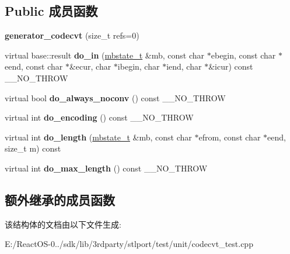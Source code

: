 \subsection*{Public 成员函数}
\begin{DoxyCompactItemize}
\item 
\mbox{\label{structgenerator__codecvt_ab4e85042054347530e588ae056644cb0}} 
{\bfseries generator\+\_\+codecvt} (size\+\_\+t refs=0)
\item 
\mbox{\label{structgenerator__codecvt_afbd534840122d0f18c35f8a66180970b}} 
virtual base\+::result {\bfseries do\+\_\+in} (\hyperlink{struct____mbstate__t}{mbstate\+\_\+t} \&mb, const char $\ast$ebegin, const char $\ast$eend, const char $\ast$\&ecur, char $\ast$ibegin, char $\ast$iend, char $\ast$\&icur) const \+\_\+\+\_\+\+N\+O\+\_\+\+T\+H\+R\+OW
\item 
\mbox{\label{structgenerator__codecvt_a9afeeb04baa6d338e45ce147ce553cb4}} 
virtual bool {\bfseries do\+\_\+always\+\_\+noconv} () const \+\_\+\+\_\+\+N\+O\+\_\+\+T\+H\+R\+OW
\item 
\mbox{\label{structgenerator__codecvt_a3cadf7943c3a10a6350cfa6c165f7dce}} 
virtual int {\bfseries do\+\_\+encoding} () const \+\_\+\+\_\+\+N\+O\+\_\+\+T\+H\+R\+OW
\item 
\mbox{\label{structgenerator__codecvt_a54c51b2462a772b1638be4f178df8db7}} 
virtual int {\bfseries do\+\_\+length} (\hyperlink{struct____mbstate__t}{mbstate\+\_\+t} \&mb, const char $\ast$efrom, const char $\ast$eend, size\+\_\+t m) const
\item 
\mbox{\label{structgenerator__codecvt_a0c32247ab116f780f5a7db57041c0a72}} 
virtual int {\bfseries do\+\_\+max\+\_\+length} () const \+\_\+\+\_\+\+N\+O\+\_\+\+T\+H\+R\+OW
\end{DoxyCompactItemize}
\subsection*{额外继承的成员函数}


该结构体的文档由以下文件生成\+:\begin{DoxyCompactItemize}
\item 
E\+:/\+React\+O\+S-\/0../sdk/lib/3rdparty/stlport/test/unit/codecvt\+\_\+test.\+cpp\end{DoxyCompactItemize}
